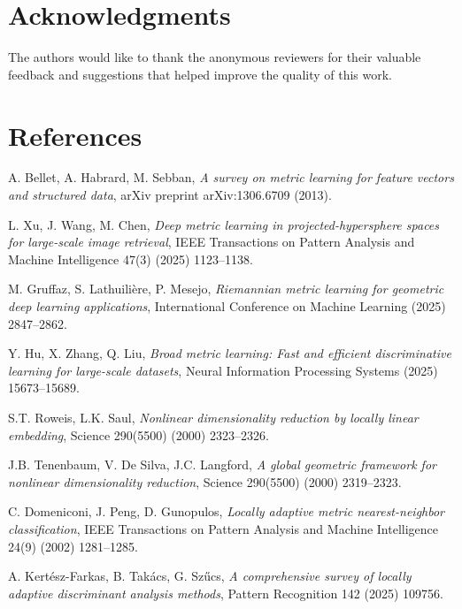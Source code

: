 \documentclass[review]{elsarticle}
\begin{document}
\section*{Acknowledgments}

The authors would like to thank the anonymous reviewers for their valuable feedback and suggestions that helped improve the quality of this work.

\section*{References}


\begin{thebibliography}{99}

A. Bellet, A. Habrard, M. Sebban,
\textit{A survey on metric learning for feature vectors and structured data},
arXiv preprint arXiv:1306.6709 (2013).

L. Xu, J. Wang, M. Chen,
\textit{Deep metric learning in projected-hypersphere spaces for large-scale image retrieval},
IEEE Transactions on Pattern Analysis and Machine Intelligence 47(3) (2025) 1123--1138.

M. Gruffaz, S. Lathuilière, P. Mesejo,
\textit{Riemannian metric learning for geometric deep learning applications},
International Conference on Machine Learning (2025) 2847--2862.

Y. Hu, X. Zhang, Q. Liu,
\textit{Broad metric learning: Fast and efficient discriminative learning for large-scale datasets},
Neural Information Processing Systems (2025) 15673--15689.

S.T. Roweis, L.K. Saul,
\textit{Nonlinear dimensionality reduction by locally linear embedding},
Science 290(5500) (2000) 2323--2326.

J.B. Tenenbaum, V. De Silva, J.C. Langford,
\textit{A global geometric framework for nonlinear dimensionality reduction},
Science 290(5500) (2000) 2319--2323.

C. Domeniconi, J. Peng, D. Gunopulos,
\textit{Locally adaptive metric nearest-neighbor classification},
IEEE Transactions on Pattern Analysis and Machine Intelligence 24(9) (2002) 1281--1285.

A. Kertész-Farkas, B. Takács, G. Szűcs,
\textit{A comprehensive survey of locally adaptive discriminant analysis methods},
Pattern Recognition 142 (2025) 109756.


\end{thebibliography}
\end{document}

